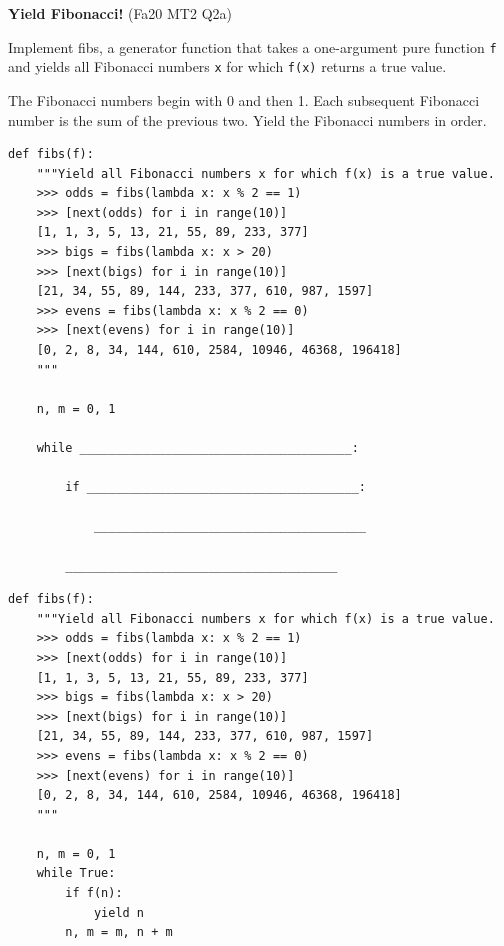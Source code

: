 \documentclass{exam}
\newlength{\currentparskip}
\newenvironment{blocksection}
{
    \setlength{\currentparskip}{\parskip}%
    \begin{minipage}{\linewidth}
    \setlength{\parskip}{\currentparskip}%
}
{
    \end{minipage}
}
\begin{document}
\begin{questions}
    
\begin{blocksection}
\question \textbf{Yield Fibonacci!} (Fa20 MT2 Q2a)

    Implement fibs, a generator function that takes a one-argument pure function \lstinline{f} and yields all Fibonacci numbers \lstinline{x} for which \lstinline{f(x)} returns a true value.
    
    The Fibonacci numbers begin with 0 and then 1. Each subsequent Fibonacci number is the sum of the previous two. Yield the Fibonacci numbers in order.
\begin{lstlisting}
def fibs(f):
    """Yield all Fibonacci numbers x for which f(x) is a true value.
    >>> odds = fibs(lambda x: x % 2 == 1)
    >>> [next(odds) for i in range(10)]
    [1, 1, 3, 5, 13, 21, 55, 89, 233, 377]
    >>> bigs = fibs(lambda x: x > 20)
    >>> [next(bigs) for i in range(10)]
    [21, 34, 55, 89, 144, 233, 377, 610, 987, 1597]
    >>> evens = fibs(lambda x: x % 2 == 0)
    >>> [next(evens) for i in range(10)]
    [0, 2, 8, 34, 144, 610, 2584, 10946, 46368, 196418]
    """
    
    n, m = 0, 1

    while ______________________________________:

        if ______________________________________:

            ______________________________________

        ______________________________________
\end{lstlisting}
\end{blocksection}
\begin{solution}
\begin{lstlisting}
def fibs(f):
    """Yield all Fibonacci numbers x for which f(x) is a true value.
    >>> odds = fibs(lambda x: x % 2 == 1)
    >>> [next(odds) for i in range(10)]
    [1, 1, 3, 5, 13, 21, 55, 89, 233, 377]
    >>> bigs = fibs(lambda x: x > 20)
    >>> [next(bigs) for i in range(10)]
    [21, 34, 55, 89, 144, 233, 377, 610, 987, 1597]
    >>> evens = fibs(lambda x: x % 2 == 0)
    >>> [next(evens) for i in range(10)]
    [0, 2, 8, 34, 144, 610, 2584, 10946, 46368, 196418]
    """
    
    n, m = 0, 1
    while True:
        if f(n):
            yield n
        n, m = m, n + m
\end{lstlisting}
\end{solution}



\end{questions}
\end{document}
